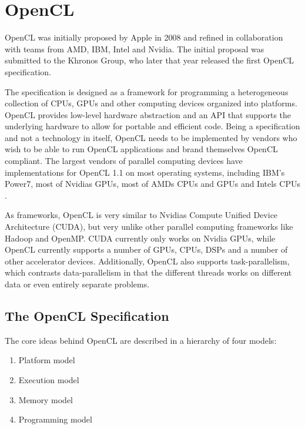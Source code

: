 \section{OpenCL}

OpenCL was initially proposed by Apple in 2008 and refined in
collaboration with teams from AMD, IBM, Intel and Nvidia. The initial
proposal was submitted to the Khronos Group\cite{cl-spec}, who later
that year released the first OpenCL specification.

The specification is designed as a framework for programming a
heterogeneous collection of CPUs, GPUs and other computing devices
organized into platforms. OpenCL provides low-level hardware
abstraction and an API that supports the underlying hardware to allow
for portable and efficient code. Being a specification and not a
technology in itself, OpenCL needs to be implemented by vendors who
wish to be able to run OpenCL applications and brand themselves OpenCL
compliant. The largest vendors of parallel computing devices have
implementations for OpenCL 1.1 on most operating systems, including
IBM's Power7\cite{ibm-opencl}, most of Nvidias
GPUs\cite{nvidia-opencl}, most of AMDs CPUs and GPUs \cite{amd-opencl}
and Intels CPUs \cite{intel-opencl}.

As frameworks, OpenCL is very similar to Nvidias Compute Unified
Device Architecture (CUDA), but very unlike other parallel computing
frameworks like Hadoop\cite{hadoop} and OpenMP\cite{openmp}. CUDA
currently only works on Nvidia GPUs, while OpenCL currently supports a
number of GPUs, CPUs, DSPs and a number of other accelerator devices.
Additionally, OpenCL also supports task-parallelism, which contrasts
data-parallelism in that the different threads works on different
data or even entirely separate problems.

\subsection{The OpenCL Specification}

The core ideas behind OpenCL are described in a hierarchy of four
models\cite{cl-spec}:

\begin{enumerate}
  \item Platform model
  \item Execution model
  \item Memory model
  \item Programming model
\end{enumerate}

